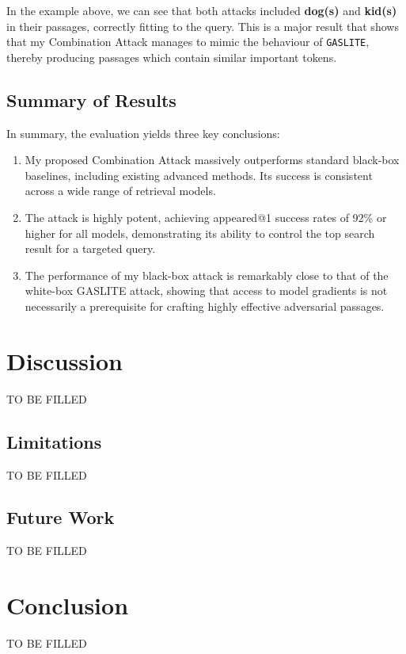 \documentclass[a4paper, sigconf]{acmart}
\begin{document}
In the example above, we can see that both attacks included \textbf{dog(s)} and \textbf{kid(s)} in their passages, correctly fitting to the query. This is a major result that shows that my Combination Attack manages to mimic the behaviour of \texttt{GASLITE}, thereby producing passages which contain similar important tokens.

\subsection{Summary of Results}

In summary, the evaluation yields three key conclusions:
\begin{enumerate}
  \item My proposed Combination Attack massively outperforms standard black-box baselines, including existing advanced methods. Its success is consistent across a wide range of retrieval models.
  \item The attack is highly potent, achieving appeared@1 success rates of 92\% or higher for all models, demonstrating its ability to control the top search result for a targeted query.
  \item The performance of my black-box attack is remarkably close to that of the white-box GASLITE attack, showing that access to model gradients is not necessarily a prerequisite for crafting highly effective adversarial passages.
\end{enumerate}


\section{Discussion}

TO BE FILLED


\subsection{Limitations}

TO BE FILLED


\subsection{Future Work}

TO BE FILLED

\section{Conclusion}

TO BE FILLED


 

\end{document}
